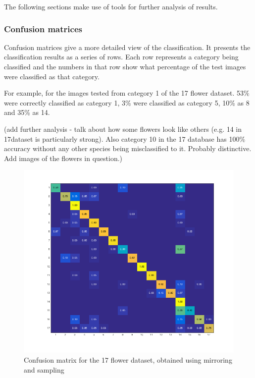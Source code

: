 \documentclass[11pt, a4paper]{report}
\begin{document}
The following sections make use of tools for further analysis of results. 

\subsubsection{Confusion matrices}

Confusion matrices give a more detailed view of the classification. It presents the classification results as a series of rows. Each row represents a category being classified and the numbers in that row show what percentage of the test images were classified as that category. 

For example, for the images tested from category 1 of the 17 flower dataset. 53\% were correctly classified as category 1, 3\% were classified as category 5, 10\% as 8 and 35\% as 14.

(add further analysis - talk about how some flowers look like others (e.g. 14 in 17dataset is particularly strong). Also category 10 in the 17 database has 100\% accuracy without any other species being misclassified to it. Probably distinctive. Add images of the flowers in question.)


\begin{figure}[hbt]
	\centering
  \includegraphics[totalheight=15cm]{img/15.png}
  \caption{Confusion matrix for the 17 flower dataset, obtained using mirroring and sampling}
  \label{img:15}
\end{figure}
\end{document}
